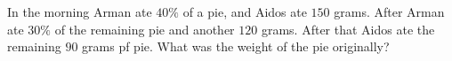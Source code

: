 In the morning Arman ate $40\%$ of a pie, and Aidos ate $150$ grams. After Arman ate $30\%$ of the remaining pie and another $120$ grams. After that Aidos ate the remaining $90$ grams pf pie. What was the weight of the pie originally?
